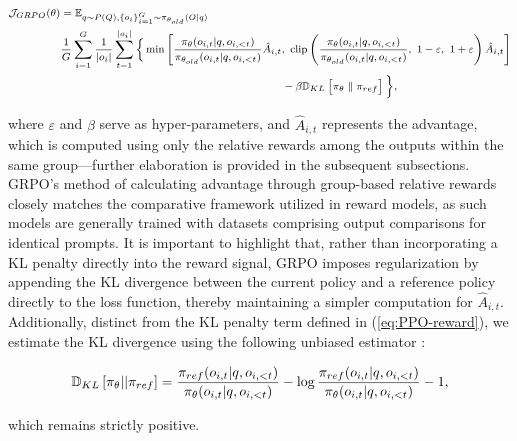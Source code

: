 \begin{itemize}[topsep=0pt]
\begin{itemize}[topsep=0pt]
\begin{equation}
\footnotesize
\begin{split}
    \mathcal{J}_{GRPO}(\theta) &= \mathbb{E}_{q \sim P(Q), \{o_i\}_{i=1}^G \sim \pi_{\theta_{old}}(O|q)}  \\
    & \frac{1}{G}\sum_{i=1}^G\frac{1}{|o_i|} \sum_{t=1}^{|o_i|} \bigg\{ \min \Bigg[ \frac{\pi_\theta(o_{i,t} | q, o_{i,<t})}{\pi_{\theta_{old}}(o_{i,t} | q, o_{i,<t})} \hat{A}_{i,t},\ \text{clip} \left( \frac{\pi_\theta(o_{i,t} | q, o_{i,<t})}{\pi_{\theta_{old}}(o_{i,t} | q, o_{i,<t})},\ 1 - \varepsilon,\ 1 + \varepsilon \right) \hat{A}_{i,t} \Bigg] \\
    &\hspace{6cm} - \beta \mathbb{D}_{KL}\left[\pi_{\theta} \parallel \pi_{ref}\right]\bigg\} ,
\end{split}
\label{eq:GRPO-obj}
\end{equation}

where $\varepsilon$ and $\beta$ serve as hyper-parameters, and $\hat{A}_{i,t}$ represents the advantage, which is computed using only the relative rewards among the outputs within the same group—further elaboration is provided in the subsequent subsections. GRPO’s method of calculating advantage through group-based relative rewards closely matches the comparative framework utilized in reward models, as such models are generally trained with datasets comprising output comparisons for identical prompts. It is important to highlight that, rather than incorporating a KL penalty directly into the reward signal, GRPO imposes regularization by appending the KL divergence between the current policy and a reference policy directly to the loss function, thereby maintaining a simpler computation for $\hat{A}_{i,t}$. Additionally, distinct from the KL penalty term defined in (\ref{eq:PPO-reward}), we estimate the KL divergence using the following unbiased estimator \citep{kl_approx}:

\begin{equation}
\small
    \mathbb{D}_{KL}\left[\pi_{\theta} || \pi_{ref}\right] = \frac{\pi_{ref}(o_{i,t}|q,o_{i,<t})}{\pi_{\theta}(o_{i,t}|q,o_{i,<t})}- \log\frac{\pi_{ref}(o_{i,t}|q,o_{i,<t})}{\pi_{\theta}(o_{i,t}|q,o_{i,<t})} - 1,
\end{equation}

which remains strictly positive.


\end{itemize}
\end{itemize}
